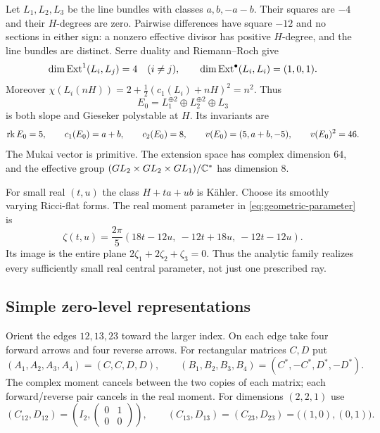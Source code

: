 Let $L_1,L_2,L_3$ be the line bundles with classes $a,b,-a-b$.
Their squares are $-4$ and their $H$-degrees are zero.
Pairwise differences have square $-12$ and no sections in either
sign: a nonzero effective divisor has positive $H$-degree, and
the line bundles are distinct. Serre duality and Riemann--Roch give
\begin{equation}\label{eq:line-exts}
 \dim\operatorname{Ext}^1(L_i,L_j)=4\quad(i\ne j),\qquad
 \dim\operatorname{Ext}^\bullet(L_i,L_i)=(1,0,1).
\end{equation}
Moreover
$\chi(L_i(nH))=2+\tfrac12(c_1(L_i)+nH)^2=n^2$.
Thus
\[
 E_0=L_1^{\oplus2}\oplus L_2^{\oplus2}\oplus L_3
\]
is both slope and Gieseker polystable at $H$.
Its invariants are
\begin{equation}\label{eq:mukai-example}
 \operatorname{rk} E_0=5,\qquad c_1(E_0)=a+b,\qquad c_2(E_0)=8,\qquad
 v(E_0)=(5,a+b,-5),\qquad v(E_0)^2=46.
\end{equation}
The Mukai vector is primitive. The extension space has complex
dimension $64$, and the effective group
$(GL_2\times GL_2\times GL_1)/\mathbb C^*$ has dimension $8$.

For small real $(t,u)$ the class $H+ta+ub$ is K\"ahler.
Choose its smoothly varying Ricci-flat forms. The real moment
parameter in \eqref{eq:geometric-parameter} is
\begin{equation}\label{eq:two-parameter}
 \zeta(t,u)=\frac{2\pi}{5}(18t-12u,\ -12t+18u,\ -12t-12u).
\end{equation}
Its image is the entire plane $2\zeta_1+2\zeta_2+\zeta_3=0$.
Thus the analytic family realizes every sufficiently small real
central parameter, not just one prescribed ray.

\subsection{Simple zero-level representations}
Orient the edges $12,13,23$ toward the larger index. On each edge
take four forward arrows and four reverse arrows. For rectangular
matrices $C,D$ put
\begin{equation}\label{eq:paired-seed}
 (A_1,A_2,A_3,A_4)=(C,C,D,D),\qquad
 (B_1,B_2,B_3,B_4)=(C^*,-C^*,D^*,-D^*).
\end{equation}
The complex moment cancels between the two copies of each matrix;
each forward/reverse pair cancels in the real moment.
For dimensions $(2,2,1)$ use
\[
 (C_{12},D_{12})=
 \left(I_2,\begin{pmatrix}0&1\\0&0\end{pmatrix}\right),
 \qquad
 (C_{13},D_{13})=(C_{23},D_{23})
 =\bigl((1,0),(0,1)\bigr).
\]

